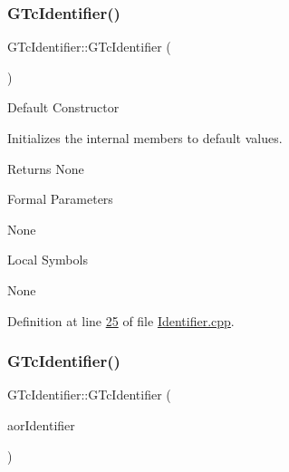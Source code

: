 \subsubsection{\texorpdfstring{G\+Tc\+Identifier()}{GTcIdentifier()}\hspace{0.1cm}{\footnotesize\ttfamily [1/2]}}
{\footnotesize\ttfamily G\+Tc\+Identifier\+::\+G\+Tc\+Identifier (\begin{DoxyParamCaption}\item[{void}]{ }\end{DoxyParamCaption})}

Default Constructor

Initializes the internal members to default values.

\begin{DoxyReturn}{Returns}
None
\end{DoxyReturn}
\begin{DoxyParagraph}{Formal Parameters}

\begin{DoxyPre}{\ttfamily  None }\end{DoxyPre}

\end{DoxyParagraph}
\begin{DoxyParagraph}{Local Symbols}

\begin{DoxyPre}{\ttfamily  None }\end{DoxyPre}
 
\end{DoxyParagraph}


Definition at line \mbox{\hyperlink{_identifier_8cpp_source_l00025}{25}} of file \mbox{\hyperlink{_identifier_8cpp_source}{Identifier.\+cpp}}.

\mbox{\label{class_g_n_common_1_1_g_n_notification_1_1_g_tc_identifier_a189028de7c5fbbde1ba30fe1a6525e43}} 
\subsubsection{\texorpdfstring{G\+Tc\+Identifier()}{GTcIdentifier()}\hspace{0.1cm}{\footnotesize\ttfamily [2/2]}}
{\footnotesize\ttfamily G\+Tc\+Identifier\+::\+G\+Tc\+Identifier (\begin{DoxyParamCaption}\item[{const \mbox{\hyperlink{class_g_n_common_1_1_g_n_notification_1_1_g_tc_identifier}{G\+Tc\+Identifier}} \&}]{aor\+Identifier }\end{DoxyParamCaption})}

